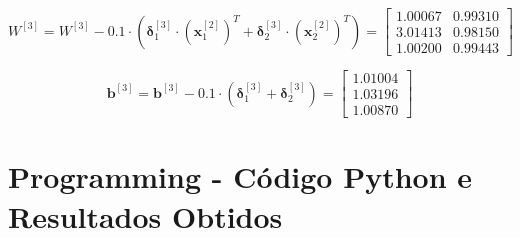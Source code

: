 \documentclass[a4paper,12pt]{article} %
\begin{document}
\begin{enumerate}
\begin{equation*}
    W^{[3]} = W^{[3]} - 0.1 \cdot (\bm{\delta}^{[3]}_1 \cdot (\textbf{x}^{[2]}_1)^T + \bm{\delta}^{[3]}_2 \cdot (\textbf{x}^{[2]}_2)^T) = \begin{bmatrix} 1.00067 & 0.99310 \\
                                                                                                                            3.01413 & 0.98150 \\
                                                                                                                            1.00200 & 0.99443 \end{bmatrix}
\end{equation*}

\begin{equation*}
    \textbf{b}^{[3]} = \textbf{b}^{[3]} - 0.1 \cdot (\bm{\delta}^{[3]}_1 + \bm{\delta}^{[3]}_2) = \begin{bmatrix} 1.01004 \\ 1.03196 \\ 1.00870 \end{bmatrix}
\end{equation*}

\end{enumerate}

\clearpage
\section*{Programming - Código Python e Resultados Obtidos}
\end{document}
